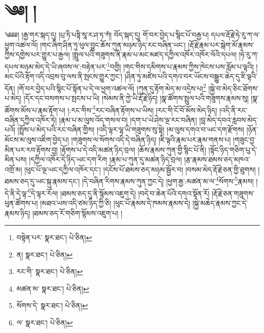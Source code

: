\setcounter{footnote}{0} 
\chapter{༄༅། །}༄༅༅། །རྒྱ་གར་སྐད་དུ། །པྲ་ཏི་པཏྟི་སཱ་ར་ཤ་ཏ་ཀཾ། བོད་སྐད་དུ། གོ་བར་བྱེད་པ་སྙིང་པོ་བརྒྱ་པ། དཔལ་རྡོ་རྗེ་ཧེ་རུ་ཀ་ལ་ཕྱག་འཚལ་ལོ། །གང་ཞིག་ཤིན་ཏུ་ཕུལ་བྱུང་ཆོས་ཀུན་མཉམ་ཉིད་རང་བཞིན་ཡང་། །རྡོ་རྗེ་རྣམ་པར་སྒེག་མོ་རྣམས་ཀྱིས་དགྱེས་པར་གྱུར་པ་རྒྱལ། །སྤྲུལ་པའི་གཟུགས་ནི་རྣམ་པ་མང་མཛད་དཀྱིལ་འཁོར་འཁོར་ལོའི་དཔལ། །ཧེ་རུ་ཀ་དཔལ་མཉམ་མེད་དེ་ཡི་ཞབས་ལ་:བརྟེན་པར་\footnote{བསྟེན་པར་  སྣར་ཐང་།  པེ་ཅིན། }བགྱི། །གང་གིས་དམིགས་པ་རྣམས་ཀྱིས་ཁེངས་པས་རློམ་པ་ལྟའི། །མང་པོའི་རྟོག་འདི་འབྲས་བུ་ལས་ནི་སྤངས་གྱུར་ཀྱང་། །ཤིན་ཏུ་མཛེས་པའི་དགའ་བར་ཡོངས་བསྒྱུར་ཆེད་དུ་ཇི་ལྟའི་དོན། །གོ་བར་བྱེད་པའི་སྙིང་པོ་སྟོན་པ་དེ་ལ་ཕྱག་འཚལ་ལོ། །ཀུན་དུ་རྟོག་མེད་མ་འདྲེས་པ།\footnote{ན།  སྣར་ཐང་།  པེ་ཅིན། } །སྐྱེ་བ་མེད་ཅིང་ཐོགས་པ་མེད། །དོར་དང་བསགས་པ་སྤངས་པ་ཡི། །སེམས་ནི་ཀྱེ་ཡི་རྡོ་རྗེ་ཉིད། །སྣ་ཚོགས་སྤྲུལ་པའི་གཟུགས་རྣམས་སུ། །སྣ་ཚོགས་མོས་པ་རྣམ་རྟོག་པ། །:རང་གིས་\footnote{རང་གི་  སྣར་ཐང་།  པེ་ཅིན། }རང་བཞིན་རྟོགས་པ་ཡིས། །རང་གི་ངོ་བོ་མོས་མེད་ཉིད། །འདི་ནི་རང་བཞིན་དཀྱིལ་འཁོར་ཏེ། །རྣམ་པ་མ་ལུས་འོད་གསལ་བ། །དག་པ་ཡེ་ཤེས་ལྔ་རང་བཞིན། །བླ་མེད་དབའ་རླབས་མེད་པའོ། །སྤྲོས་པ་མེད་པའི་རང་བཞིན་གྱིས། །འདི་ལྟར་ལྷ་ཡི་གཟུགས་སུ་སྟེ། །མ་ལུས་དགའ་བ་ཡང་དག་རྫོགས། །ཉོན་མོངས་མ་ལུས་འཇིག་བྱེད་པ། །གཟུགས་ལ་སོགས་འདི་དེ་བཞིན་ཉིད། །ཇི་ལྟའི་རྣམ་པར་རྣམ་གནས་པ། །གཟུང་བྱ་མིན་པར་རབ་རྟོགས་བྱ། །རྟོགས་པ་དེ་འདི་མཚན་ཉིད་བྲལ། །ཆོས་རྣམས་ཀུན་གྱི་སྙིང་པོ་ནི། །སྟོང་ཉིད་གཅིག་པུ་དེ་མིན་པས། །དཀྱིལ་འཁོར་དེ་ཉིད་ཡང་དག་རིག །རྣམ་པ་ཀུན་དུ་མཚན་ཉིད་བྲལ། །རྩ་རྣམས་ཐམས་ཅད་མཁའ་འགྲོ་མ། །ཕུང་པོ་ལྔ་ཡང་དཀྱིལ་འཁོར་དང་། །དངོས་པོ་ཐམས་ཅད་མཉམ་སྦྱོར་བ། །བསམ་མེད་རྡོ་རྗེ་ཅན་གྱི་ཐུགས། །ཐམས་ཅད་དུ་ཡང་སྐུ་རྣམས་དང་། །དེ་བཞིན་རིགས་རྣམས་ཀུན་ཀྱང་དེ། །ཕྱག་རྒྱ་:མཚན་མ་ལ་\footnote{མཚན་མ་  སྣར་ཐང་།  པེ་ཅིན། }སོགས་\footnote{སོགས་དེ་  སྣར་ཐང་།  པེ་ཅིན། }རྣམས། །དེ་ནི་དེ་ལྟ་\footnote{ལ་  སྣར་ཐང་།  པེ་ཅིན། }དེ་ལྟར་རོལ། །ཐམས་ཅད་དུ་ནི་སྙོམས་འཇུག་དེ། །བདེ་བ་ཆེན་པོའི་དགའ་སྟོན་རོ། །རྡོ་རྗེ་ཅན་གཟུགས་ཕུན་ཚོགས་པ། །མཐའ་ཡས་འདི་ཙམ་ཉིད་ཀྱི་ཅི། །ཕུང་པོ་རྣམས་དེ་ཁམས་རྣམས་དེ། །སྐྱེ་མཆེད་རྣམས་ཀྱང་དེ་རྣམས་ཉིད། །ཐམས་ཅད་རོ་གཅིག་སྙོམས་འཇུག་པ། །

